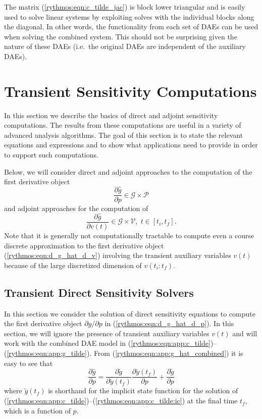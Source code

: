 \documentclass[pdf,ps2pdf,11pt]{SANDreport}
\begin{document}
The matrix (\ref{rythmos:eqn:c_tilde_jac}) is block lower triangular and is
easily used to solve linear systems by exploiting solves with the individual
blocks along the diagonal.  In other words, the functionality from each set of
DAEs can be used when solving the combined system.  This should not be
surprising given the nature of these DAEs (i.e.\ the original DAEs are
independent of the auxiliary DAEs).

\section{Transient Sensitivity Computations}
\label{rythmos:scn:transientsensitivity}

In this section we describe the basics of direct and adjoint sensitivity
computations.  The results from these computations are useful in a variety of
advanced analysis algorithms.  The goal of this section is to state the
relevant equations and expressions and to show what applications need to
provide in order to support such computations.

Below, we will consider direct and adjoint approaches to the computation of
the first derivative object
%
\begin{equation}
\frac{\partial \hat{g}}{\partial p} \in \mathcal{G} \times \mathcal{P}
\label{rythmos:eqn:d_g_hat_d_p}
\end{equation}
%
and adjoint approaches for the computation of
%
\begin{equation}
\frac{\partial \hat{g}}{\partial v(t)} \in \mathcal{G} \times \mathcal{V}, \; t \in [t_i,t_f].
\label{rythmos:eqn:d_g_hat_d_v}
\end{equation}
%
Note that it is generally not computationally tractable to compute even a
course discrete approximation to the first derivative object
(\ref{rythmos:eqn:d_g_hat_d_v}) involving the transient auxiliary variables
$v(t)$ because of the large discretized dimension of $v(t_i:t_f)$.

\subsection{Transient Direct Sensitivity Solvers}
\label{rythmos:scn:transientsensitivity:direct}

In this section we consider the solution of direct sensitivity equations to
compute the first derivative object ${}\partial {}\hat{g} / {}\partial p$ in
(\ref{rythmos:eqn:d_g_hat_d_p}).  In this section, we will ignore the presence
of transient auxiliary variables $v(t)$ and will work with the combined DAE
model in (\ref{rythmos:eqn:app:c_tilde})--(\ref{rythmos:eqn:app:g_tilde}).
From (\ref{rythmos:eqn:app:g_hat_combined}) it is easy to see that
%
\begin{equation}
\frac{\partial \hat{g}}{\partial p}
= \frac{\partial \tilde{g}}{\partial \tilde{y}(t_f)} \frac{\partial \tilde{y}(t_f)}{\partial p} 
+ \frac{\partial \tilde{g}}{\partial p}
\label{rythmos:eqn:app:g_hat_direct}
\end{equation}
%
where $\tilde{y}(t_f)$ is shorthand for the implicit state function for the
solution of
(\ref{rythmos:eqn:app:c_tilde})--(\ref{rythmos:eqn:app:c_tilde:ic}) at the
final time $t_f$, which is a function of $p$.
\end{document}
